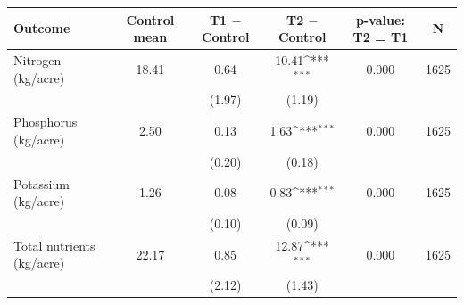 {
\def\sym#1{\ifmmode^{#1}\else\(^{#1}\)\fi}
\begin{tabular}{lccccc}
\hline\hline
Outcome & Control mean & T1 $-$ Control & T2 $-$ Control & p-value: T2 = T1 & N \\
\hline
Nitrogen (kg/acre) & 18.41 & 0.64 & 10.41\sym{***} & 0.000 & 1625 \\
& & (1.97) & (1.19) & & \\
Phosphorus (kg/acre) & 2.50 & 0.13 & 1.63\sym{***} & 0.000 & 1625 \\
& & (0.20) & (0.18) & & \\
Potassium (kg/acre) & 1.26 & 0.08 & 0.83\sym{***} & 0.000 & 1625 \\
& & (0.10) & (0.09) & & \\
Total nutrients (kg/acre) & 22.17 & 0.85 & 12.87\sym{***} & 0.000 & 1625 \\
& & (2.12) & (1.43) & & \\
\hline\hline
\end{tabular}
}
